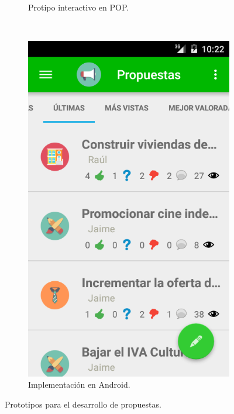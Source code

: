 \begin{enumerate}[label=\textbf{\arabic*})]
\begin{figure}[!]
\begin{subfigure}[b]{0.3\textwidth}
                \caption{Protipo interactivo en POP.}
                \label{fig:quipText}
        \end{subfigure}
        ~
        \begin{subfigure}[b]{0.3\textwidth}
                \includegraphics[width=\textwidth]{Media/Captures/prot2_3.png}
                \caption{Implementación en Android.}
                \label{fig:quipComments}
        \end{subfigure}
        \caption{Prototipos para el desarrollo de propuestas.}\label{fig:protProposals}
	\end{figure}


\end{enumerate}
